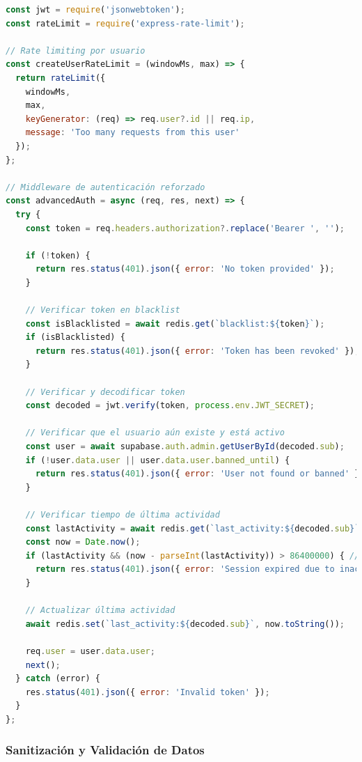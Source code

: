 \documentclass[12pt,a4paper]{report}
\begin{document}
\begin{lstlisting}[language=JavaScript, caption=Implementación de seguridad JWT avanzada]
const jwt = require('jsonwebtoken');
const rateLimit = require('express-rate-limit');

// Rate limiting por usuario
const createUserRateLimit = (windowMs, max) => {
  return rateLimit({
    windowMs,
    max,
    keyGenerator: (req) => req.user?.id || req.ip,
    message: 'Too many requests from this user'
  });
};

// Middleware de autenticación reforzado
const advancedAuth = async (req, res, next) => {
  try {
    const token = req.headers.authorization?.replace('Bearer ', '');
    
    if (!token) {
      return res.status(401).json({ error: 'No token provided' });
    }
    
    // Verificar token en blacklist
    const isBlacklisted = await redis.get(`blacklist:${token}`);
    if (isBlacklisted) {
      return res.status(401).json({ error: 'Token has been revoked' });
    }
    
    // Verificar y decodificar token
    const decoded = jwt.verify(token, process.env.JWT_SECRET);
    
    // Verificar que el usuario aún existe y está activo
    const user = await supabase.auth.admin.getUserById(decoded.sub);
    if (!user.data.user || user.data.user.banned_until) {
      return res.status(401).json({ error: 'User not found or banned' });
    }
    
    // Verificar tiempo de última actividad
    const lastActivity = await redis.get(`last_activity:${decoded.sub}`);
    const now = Date.now();
    if (lastActivity && (now - parseInt(lastActivity)) > 86400000) { // 24 horas
      return res.status(401).json({ error: 'Session expired due to inactivity' });
    }
    
    // Actualizar última actividad
    await redis.set(`last_activity:${decoded.sub}`, now.toString());
    
    req.user = user.data.user;
    next();
  } catch (error) {
    res.status(401).json({ error: 'Invalid token' });
  }
};
\end{lstlisting}

\subsubsection{Sanitización y Validación de Datos}
\end{document}

